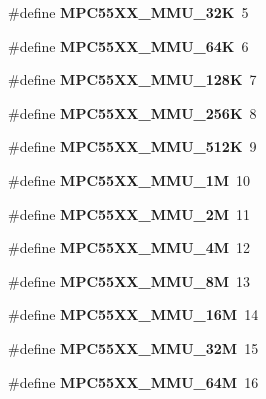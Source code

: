 \begin{DoxyCompactItemize}
\#define {\bfseries M\+P\+C55\+X\+X\+\_\+\+M\+M\+U\+\_\+32K}~5
\item 
\mbox{\label{regs-mmu_8h_ab03e57b68fbd718073573a233a5d856f}} 
\#define {\bfseries M\+P\+C55\+X\+X\+\_\+\+M\+M\+U\+\_\+64K}~6
\item 
\mbox{\label{regs-mmu_8h_a27f8ca92e743f25241ae800d6770deba}} 
\#define {\bfseries M\+P\+C55\+X\+X\+\_\+\+M\+M\+U\+\_\+128K}~7
\item 
\mbox{\label{regs-mmu_8h_ac2fa5294bfc9eac8279f37a975960c40}} 
\#define {\bfseries M\+P\+C55\+X\+X\+\_\+\+M\+M\+U\+\_\+256K}~8
\item 
\mbox{\label{regs-mmu_8h_ad1f27409b98e0ec20ca4de5c1871c6f3}} 
\#define {\bfseries M\+P\+C55\+X\+X\+\_\+\+M\+M\+U\+\_\+512K}~9
\item 
\mbox{\label{regs-mmu_8h_aefbfc987e5a23ba98cbe4f278477f1a0}} 
\#define {\bfseries M\+P\+C55\+X\+X\+\_\+\+M\+M\+U\+\_\+1M}~10
\item 
\mbox{\label{regs-mmu_8h_acfd5d85c17f73089c197989f38608c72}} 
\#define {\bfseries M\+P\+C55\+X\+X\+\_\+\+M\+M\+U\+\_\+2M}~11
\item 
\mbox{\label{regs-mmu_8h_abfd669ad62641303961ff794ee00035d}} 
\#define {\bfseries M\+P\+C55\+X\+X\+\_\+\+M\+M\+U\+\_\+4M}~12
\item 
\mbox{\label{regs-mmu_8h_a95f8cefca59b8b22e3264f64f2ba5328}} 
\#define {\bfseries M\+P\+C55\+X\+X\+\_\+\+M\+M\+U\+\_\+8M}~13
\item 
\mbox{\label{regs-mmu_8h_a8e8cab683da8b82c6fb1b2b0c6eb01db}} 
\#define {\bfseries M\+P\+C55\+X\+X\+\_\+\+M\+M\+U\+\_\+16M}~14
\item 
\mbox{\label{regs-mmu_8h_a8a4d30ce726f2f8630fba7a944680403}} 
\#define {\bfseries M\+P\+C55\+X\+X\+\_\+\+M\+M\+U\+\_\+32M}~15
\item 
\mbox{\label{regs-mmu_8h_a27ee49cbcbacddce1203868dd2c4996d}} 
\#define {\bfseries M\+P\+C55\+X\+X\+\_\+\+M\+M\+U\+\_\+64M}~16

\end{DoxyCompactItemize}
